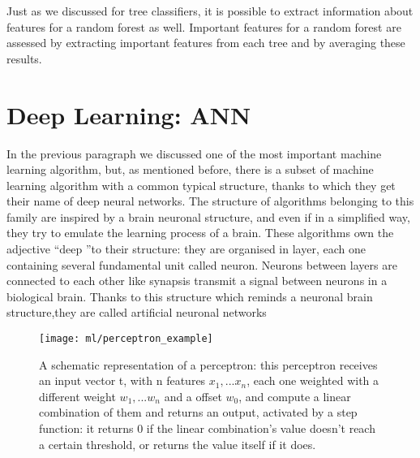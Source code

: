 \documentclass[11pt]{report}
\begin{document}

Just as we discussed for tree classifiers, it is possible to extract information about features for a random forest as well.
Important features for a random forest are assessed by extracting important features from each tree and by averaging these results.



\section{Deep Learning: ANN}\label{sec:deep_learning_theory}

In the previous paragraph we discussed one of the most important machine learning algorithm, but, as mentioned before, there is a subset of machine learning algorithm with a common typical structure, thanks to which they get their name of deep neural networks.
The structure of algorithms belonging to this family are inspired by a brain neuronal structure, and even if in a simplified way, they try to emulate the learning process of a brain.
These algorithms own the adjective \textquotedblleft deep \textquotedblright to their structure: they are organised in layer, each one containing several fundamental unit called neuron.
Neurons between layers are connected to each other like synapsis transmit a signal between neurons in a biological brain.
Thanks to this structure which reminds a neuronal brain structure,they are called artificial neuronal networks

\begin{figure}
\centering
\texttt{[image: ml/perceptron\_example]}
\caption{A schematic representation of a perceptron: this perceptron receives an input vector t, with n features $x_1, ... x_n$, each one weighted with a different weight $w_1, ... w_n$ and a offset $w_0$, and compute a linear combination of them and returns an output, activated by a step function: it returns 0 if the linear combination's value doesn't reach a certain threshold, or returns the value itself if it does.}
\label{fig:perceptron}
\end{figure}
\end{document}
